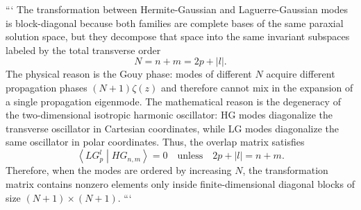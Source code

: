 \begin{resolucao}[Solution]
```
The transformation between Hermite-Gaussian and Laguerre-Gaussian modes is block-diagonal because both families are complete bases of the same paraxial solution space, but they decompose that space into the same invariant subspaces labeled by the total transverse order
\begin{equation}
    N=n+m=2p+|l|.
\end{equation}
The physical reason is the Gouy phase: modes of different $N$ acquire different propagation phases $(N+1)\zeta(z)$ and therefore cannot mix in the expansion of a single propagation eigenmode. The mathematical reason is the degeneracy of the two-dimensional isotropic harmonic oscillator: HG modes diagonalize the transverse oscillator in Cartesian coordinates, while LG modes diagonalize the same oscillator in polar coordinates. Thus, the overlap matrix satisfies
\begin{equation}
    \boxed{
    \left\langle
    LG_p^l
    \middle|
    HG_{n,m}
    \right\rangle
    =
    0
    \quad
    \text{unless}
    \quad
    2p+|l|=n+m
    }.
\end{equation}
Therefore, when the modes are ordered by increasing $N$, the transformation matrix contains nonzero elements only inside finite-dimensional diagonal blocks of size $(N+1)\times(N+1)$.
```

\end{resolucao}

